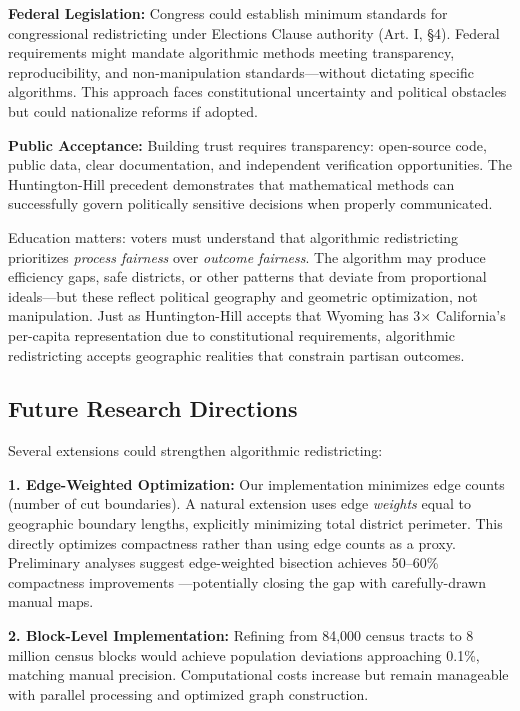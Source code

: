 \textbf{Federal Legislation:} Congress could establish minimum standards for congressional redistricting under Elections Clause authority (Art. I, §4). Federal requirements might mandate algorithmic methods meeting transparency, reproducibility, and non-manipulation standards—without dictating specific algorithms. This approach faces constitutional uncertainty and political obstacles but could nationalize reforms if adopted.

\textbf{Public Acceptance:} Building trust requires transparency: open-source code, public data, clear documentation, and independent verification opportunities. The Huntington-Hill precedent demonstrates that mathematical methods can successfully govern politically sensitive decisions when properly communicated.

Education matters: voters must understand that algorithmic redistricting prioritizes \textit{process fairness} over \textit{outcome fairness}. The algorithm may produce efficiency gaps, safe districts, or other patterns that deviate from proportional ideals—but these reflect political geography and geometric optimization, not manipulation. Just as Huntington-Hill accepts that Wyoming has 3× California's per-capita representation due to constitutional requirements, algorithmic redistricting accepts geographic realities that constrain partisan outcomes.

\subsection{Future Research Directions}

Several extensions could strengthen algorithmic redistricting:

\textbf{1. Edge-Weighted Optimization:} Our implementation minimizes edge counts (number of cut boundaries). A natural extension uses edge \textit{weights} equal to geographic boundary lengths, explicitly minimizing total district perimeter. This directly optimizes compactness rather than using edge counts as a proxy. Preliminary analyses suggest edge-weighted bisection achieves 50--60\% compactness improvements \cite{preliminary_results}—potentially closing the gap with carefully-drawn manual maps.

\textbf{2. Block-Level Implementation:} Refining from 84,000 census tracts to 8 million census blocks would achieve population deviations approaching 0.1\%, matching manual precision. Computational costs increase but remain manageable with parallel processing and optimized graph construction.

